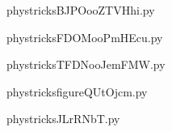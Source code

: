     

    \clearpage
    


    \newcommand{\CaptionFigBJPOooZTVHhi}{<+Type your caption here+>}
    \begin{center}
        
    \end{center}
    phystricksBJPOooZTVHhi.py

    

    \clearpage
    


    \newcommand{\CaptionFigFDOMooPmHEcu}{<+Type your caption here+>}
    \begin{center}
        
    \end{center}
    phystricksFDOMooPmHEcu.py

    

    \clearpage
    


    \newcommand{\CaptionFigTFDNooJemFMW}{<+Type your caption here+>}
    \begin{center}
        
    \end{center}
    phystricksTFDNooJemFMW.py

    

    \clearpage
    


    \newcommand{\CaptionFigfigureQUtOjcm}{<+Type your caption here+>}
    \begin{center}
        
    \end{center}
    phystricksfigureQUtOjcm.py

    

    \clearpage
    


    \newcommand{\CaptionFigJLrRNbT}{<+Type your caption here+>}
    \begin{center}
        
    \end{center}
    phystricksJLrRNbT.py

    

    \clearpage
    


